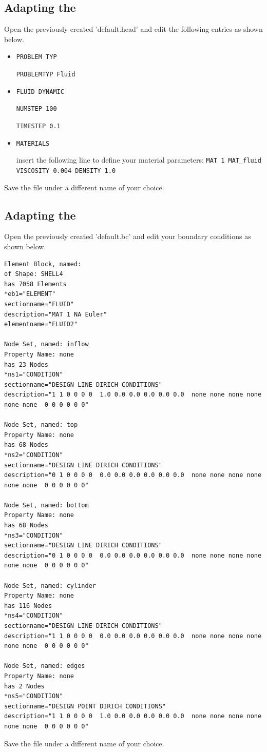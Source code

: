 \subsection{Adapting the \head}
Open the previously created \head 'default.head' and edit the following entries as shown below.
\begin{itemize}
 \item \verb|PROBLEM TYP|

 \verb|PROBLEMTYP Fluid|
 \item \verb|FLUID DYNAMIC|

 \verb|NUMSTEP 100|

 \verb|TIMESTEP 0.1|

 \item \verb|MATERIALS|

 insert the following line to define your material parameters: \newline
 \verb|MAT 1 MAT_fluid VISCOSITY 0.004 DENSITY 1.0|
 
\end{itemize}
Save the file under a different name of your choice.

\subsection{Adapting the \bc}
Open the previously created \bc 'default.bc' and edit your boundary conditions as shown below.


 \begin{small} \begin{verbatim}
Element Block, named: 
of Shape: SHELL4
has 7058 Elements
*eb1="ELEMENT"
sectionname="FLUID"
description="MAT 1 NA Euler"
elementname="FLUID2"

Node Set, named: inflow
Property Name: none
has 23 Nodes
*ns1="CONDITION"
sectionname="DESIGN LINE DIRICH CONDITIONS"
description="1 1 0 0 0 0  1.0 0.0 0.0 0.0 0.0 0.0  none none none none none none  0 0 0 0 0 0"

Node Set, named: top
Property Name: none
has 68 Nodes
*ns2="CONDITION"
sectionname="DESIGN LINE DIRICH CONDITIONS"
description="0 1 0 0 0 0  0.0 0.0 0.0 0.0 0.0 0.0  none none none none none none  0 0 0 0 0 0"

Node Set, named: bottom
Property Name: none
has 68 Nodes
*ns3="CONDITION"
sectionname="DESIGN LINE DIRICH CONDITIONS"
description="0 1 0 0 0 0  0.0 0.0 0.0 0.0 0.0 0.0  none none none none none none  0 0 0 0 0 0"

Node Set, named: cylinder
Property Name: none
has 116 Nodes
*ns4="CONDITION"
sectionname="DESIGN LINE DIRICH CONDITIONS"
description="1 1 0 0 0 0  0.0 0.0 0.0 0.0 0.0 0.0  none none none none none none  0 0 0 0 0 0"

Node Set, named: edges
Property Name: none
has 2 Nodes
*ns5="CONDITION"
sectionname="DESIGN POINT DIRICH CONDITIONS"
description="1 1 0 0 0 0  1.0 0.0 0.0 0.0 0.0 0.0  none none none none none none  0 0 0 0 0 0"
 \end{verbatim} \end{small}
Save the file under a different name of your choice.

